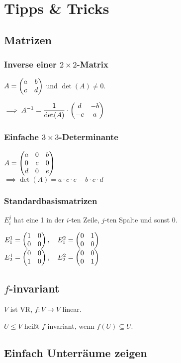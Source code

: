 \section*{Tipps \& Tricks}

\subsection*{Matrizen}

\subsubsection*{Inverse einer $2\times2$-Matrix}
$A=\begin{pmatrix} a & b \\ c & d \end{pmatrix}$ und $\det(A) \neq 0$.

$\displaystyle \implies A^{-1} = \frac{1}{\det(A)}\cdot\begin{pmatrix} d & -b \\ -c & a \end{pmatrix}$

\subsubsection*{Einfache $3\times3$-Determinante}
$A=\begin{pmatrix} a & 0 & b \\ 0 & c & 0 \\ d & 0 & e \end{pmatrix}$ \\
$\implies \det(A)=a\cdot c \cdot e - b \cdot c \cdot d$

\subsubsection*{Standardbasismatrizen}
$E_i^j$ hat eine 1 in der $i$-ten Zeile, $j$-ten Spalte und sonst 0.

$E_1^1 = \begin{pmatrix} 1 & 0 \\ 0 & 0 \end{pmatrix}, \quad E_1^2 = \begin{pmatrix} 0 & 1 \\ 0 & 0 \end{pmatrix}$ \\
$E_2^1 = \begin{pmatrix} 0 & 0 \\ 1 & 0 \end{pmatrix}, \quad E_2^2 = \begin{pmatrix} 0 & 0 \\ 0 & 1 \end{pmatrix}$

\subsection*{$f$-invariant}
$V$ ist VR, $f: V\to V$ linear.

$U\le V$ heißt $f$-invariant, wenn $f(U) \subseteq U$.

\subsection*{Einfach Unterräume zeigen}

